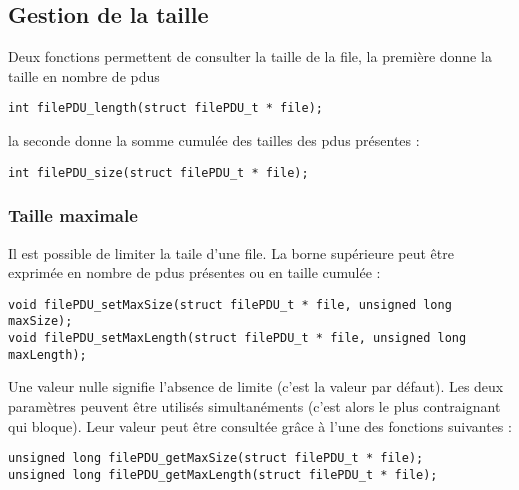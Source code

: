 \documentclass{article}
\begin{document}
\subsection{Gestion de la taille}

   Deux fonctions permettent de consulter la taille de la file, la
première donne la taille en nombre de {\sc pdu}s

\begin{verbatim}
int filePDU_length(struct filePDU_t * file);
\end{verbatim}

   la seconde donne la somme cumulée des tailles des {\sc pdu}s
présentes :

\begin{verbatim}
int filePDU_size(struct filePDU_t * file);
\end{verbatim}

%
\subsubsection{Taille maximale}

   Il est possible de limiter la taile d'une file. La borne supérieure
peut être exprimée en nombre de {\sc pdu}s présentes ou en taille
cumulée :

\begin{verbatim}
void filePDU_setMaxSize(struct filePDU_t * file, unsigned long maxSize);
void filePDU_setMaxLength(struct filePDU_t * file, unsigned long maxLength);
\end{verbatim}

   Une valeur nulle signifie l'absence de limite (c'est la valeur par
défaut). Les deux paramètres peuvent être utilisés simultanéments
(c'est alors le plus contraignant qui bloque). Leur valeur peut être
consultée grâce à l'une des fonctions suivantes :

\begin{verbatim}
unsigned long filePDU_getMaxSize(struct filePDU_t * file);
unsigned long filePDU_getMaxLength(struct filePDU_t * file);
\end{verbatim}

%
\end{document}
